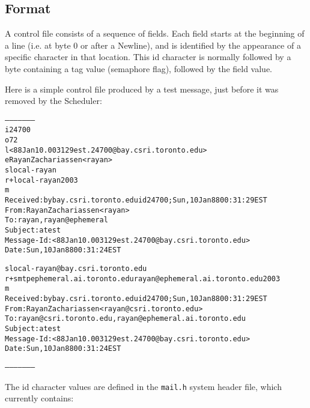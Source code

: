 \subsection{Format}

A control file consists of a sequence of fields.  Each field starts at the
beginning of a line (i.e. at byte 0 or after a Newline), and is identified
by the appearance of a specific character in that location.  This id
character is normally followed by a byte containing a tag value (semaphore
flag), followed by the field value.

Here is a simple control file produced by a test message, just before it
was removed by the Scheduler:

\begin{alltt}
     --------------------
     i 24700
     o 72
     l <88Jan10.003129est.24700@bay.csri.toronto.edu>
     e Rayan Zachariassen <rayan>
     s local - rayan
     r+local - rayan 2003
     m
     Received: by bay.csri.toronto.edu id 24700; Sun, 10 Jan 88 00:31:29 EST
     From:   Rayan Zachariassen <rayan>
     To:     rayan, rayan@ephemeral
     Subject: a test
     Message-Id: <88Jan10.003129est.24700@bay.csri.toronto.edu>
     Date:   Sun, 10 Jan 88 00:31:24 EST
     
     s local - rayan@bay.csri.toronto.edu
     r+smtp ephemeral.ai.toronto.edu rayan@ephemeral.ai.toronto.edu 2003
     m
     Received: by bay.csri.toronto.edu id 24700; Sun, 10 Jan 88 00:31:29 EST
     From:   Rayan Zachariassen <rayan@csri.toronto.edu>
     To:     rayan@csri.toronto.edu, rayan@ephemeral.ai.toronto.edu
     Subject: a test
     Message-Id: <88Jan10.003129est.24700@bay.csri.toronto.edu>
     Date:   Sun, 10 Jan 88 00:31:24 EST
     
     --------------------
\end{alltt}


The id character values are defined in the {\tt mail.h} system header file,
which currently contains:

